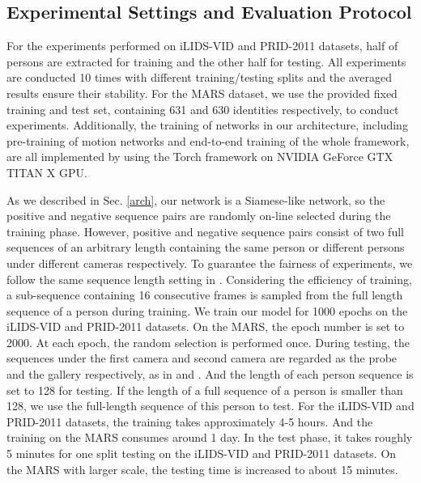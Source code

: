 \documentclass[journal]{IEEEtran}
\begin{document}
 \subsection{Experimental Settings and Evaluation Protocol}\label{exp_setting}
 For the experiments performed on iLIDS-VID and PRID-2011 datasets,  half of persons are extracted for training and the other half for testing. All experiments are conducted 10 times with different training/testing splits and the averaged results ensure their stability. For the MARS dataset, we use the provided fixed training and test set, containing 631 and 630 identities respectively, to conduct experiments. Additionally, the training of networks in our architecture, including pre-training of motion networks and end-to-end training of the whole framework, are all implemented by using the Torch\cite{torch} framework on NVIDIA GeForce GTX TITAN X GPU.
 
 As we described in Sec. \ref{arch}, our network is a Siamese-like network, so the positive  and negative sequence pairs are randomly on-line selected during the training phase. However, positive and negative sequence pairs consist of two full sequences of an arbitrary length containing the same person or different persons under different cameras respectively. To guarantee the fairness of experiments, we follow the same sequence length setting in \cite{mclaughlinrecurrent}. Considering the efficiency of  training,  a sub-sequence containing 16 consecutive frames is sampled from the full length sequence of a person during training. We train our model for 1000 epochs on the iLIDS-VID and PRID-2011 datasets. On the MARS, the epoch number is set to 2000. At each epoch, the random selection is performed once. During testing, the sequences under the first camera and second camera are regarded as the probe and  the gallery respectively, as in \cite{mclaughlinrecurrent} and \cite{wang2014person}. And the length of each person sequence is set to 128 for testing. If the length of a full sequence of  a person is smaller than 128, we use the full-length sequence of this person to test. For the iLIDS-VID and PRID-2011 datasets, the training takes approximately 4-5 hours. And the training on the MARS consumes around 1 day. In the test phase, it takes roughly 5 minutes for one split testing on the iLIDS-VID and PRID-2011 datasets. On the MARS with larger scale, the testing time is increased to about 15 minutes.
 
\end{document}
